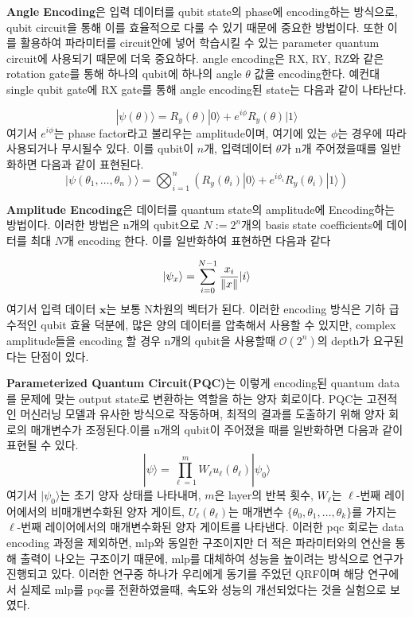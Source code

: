 \textbf{Angle Encoding}은 입력 데이터를 qubit state의 phase에 encoding하는 방식으로, qubit circuit을 통해 이를 효율적으로 다룰 수 있기 때문에 중요한 방법이다. 또한 이를 활용하여 파라미터를 circuit안에 넣어 학습시킬 수 있는 parameter quantum circuit에 사용되기 때문에 더욱 중요하다. angle encoding은 RX, RY, RZ와 같은 rotation gate를 통해 하나의 qubit에 하나의 angle $\theta$ 값을 encoding한다. 예컨대 single qubit gate에 RX gate를 통해 angle encoding된 state는 다음과 같이 나타난다. %

\[
|\psi(\theta)\rangle = R_y(\theta)|0\rangle + e^{i\phi}R_y(\theta)|1\rangle
\]
여기서 $e^{i\phi}$는 phase factor라고 불리우는 amplitude이며, 여기에 있는 $\phi$는 경우에 따라 사용되거나 무시될수 있다. 이를 qubit이 $n$개, 입력데이터 $\theta$가 n개 주어졌을때를 일반화하면 다음과 같이 표현된다.
\[
        |\psi(\theta_1, \ldots, \theta_n)\rangle = \bigotimes_{i=1}^n (R_y(\theta_i)|0\rangle + e^{i\phi_i}R_y(\theta_i)|1\rangle)
\]

\textbf{Amplitude Encoding}은 데이터를 quantum state의 amplitude에 Encoding하는 방법이다. 이러한 방법은 n개의 qubit으로 $N := 2^n$개의 basis state coefficients에 데이터를 최대 $N$개 encoding 한다. 이를 일반화하여 표현하면 다음과 같다\cite{maronese2022quantum}

\[
|\psi_x\rangle = \sum_{i=0}^{N-1} \frac{x_{i}}{\norm{x}} |i\rangle
\]
여기서 입력 데이터 $\mathbf{x}$는 보통 N차원의 벡터가 된다. 이러한 encoding 방식은 기하 급수적인 qubit 효율 덕분에, 많은 양의 데이터를 압축해서 사용할 수 있지만, complex amplitude들을 encoding 할 경우 n개의 qubit을 사용할때 $\mathcal{O}(2^n)$의 depth가 요구된다는 단점이 있다.\cite{mitsuda2024approximate}

\textbf{Parameterized Quantum Circuit(PQC)}는 이렇게 encoding된 quantum data를 문제에 맞는 output state로 변환하는 역할을 하는 양자 회로이다. PQC는 고전적인 머신러닝 모델과 유사한 방식으로 작동하며, 최적의 결과를 도출하기 위해 양자 회로의 매개변수가 조정된다.이를 n개의 qubit이 주어졌을 때를 일반화하면 다음과 같이 표현될 수 있다.
\[
|\psi\rangle = \prod_{\ell=1}^{m} W_{\ell} u_{\ell}(\theta_{\ell}) |\psi_0\rangle
\]
여기서 \( |\psi_0\rangle \)는 초기 양자 상태를 나타내며, \( m \)은 layer의 반복 횟수, \( W_{\ell} \)는 \(\ell\)-번째 레이어에서의 비매개변수화된 양자 게이트, \( U_{\ell}(\theta_{\ell}) \)는 매개변수 \(\{\theta_0, \theta_1, \ldots, \theta_k\}\)를 가지는 \(\ell\)-번째 레이어에서의 매개변수화된 양자 게이트를 나타낸다. 이러한 pqc 회로는 data encoding 과정을 제외하면, mlp와 동일한 구조이지만 더 적은 파라미터와의 연산을 통해 출력이 나오는 구조이기 때문에, mlp를 대체하여 성능을 높이려는 방식으로 연구가 진행되고 있다. 이러한 연구중 하나가 우리에게 동기를 주었던 QRF이며 해당 연구에서 실제로 mlp를 pqc를 전환하였을때, 속도와 성능의 개선되었다는 것을 실험으로 보였다.\cite{yang2022quantum}

